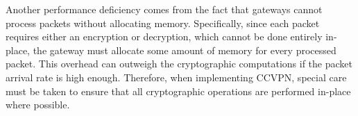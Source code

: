Another performance deficiency comes from the fact that gateways cannot process packets
without allocating memory. Specifically, since each packet requires either an encryption
or decryption, which cannot be done entirely in-place, the gateway must allocate some amount
of memory for every processed packet. This overhead can outweigh the cryptographic computations
if the packet arrival rate is high enough. Therefore, when implementing CCVPN, special care
must be taken to ensure that all cryptographic operations are performed in-place where possible. 
